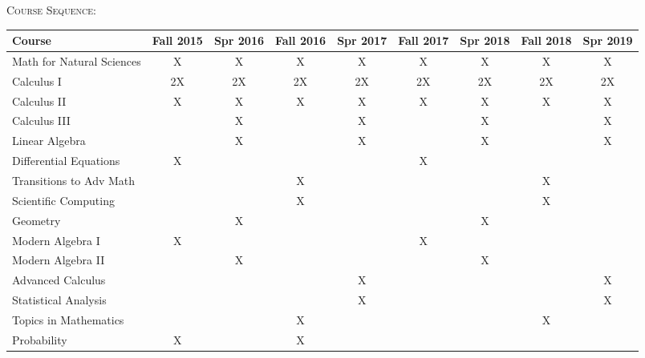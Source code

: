 \documentclass[letterpaper,10pt]{article}
\begin{document}
\begin{center}
\begin{minipage}[t]{.85\textwidth}
{\scshape  \Large Course Sequence:}\\[5pt]
\setlength{\extrarowheight}{2pt}
\begin{tabular}{ l | c | c | c |c |c |c |c |c |}
Course & Fall 2015 & Spr 2016 & Fall 2016 & Spr 2017 & Fall 2017 & Spr 2018 & Fall 2018 & Spr 2019\\
\hline
\hline
Math for Natural Sciences & X & X & X & X & X & X & X & X\\[2pt]
Calculus I                & 2X & 2X & 2X & 2X & 2X & 2X & 2X & 2X\\[2pt]
Calculus II               & X & X & X & X & X & X & X & X\\[2pt]
Calculus III              &  & X &  & X & & X & & X \\[2pt]
Linear Algebra            &  & X &  & X & & X & & X  \\[2pt]
Differential Equations    & X & & & & X &  &  &  \\[2pt]
Transitions to Adv Math   & & & X & & & & X &  \\[2pt]
Scientific Computing      & & & X & & & & X &  \\[2pt]
Geometry                  & & X & & & & X & &   \\[2pt]
Modern Algebra I          & X & & & & X & & & \\[2pt]
Modern Algebra II         & & X & & & & X & &  \\[2pt]
Advanced Calculus         & & & & X & & & & X \\[2pt]
Statistical Analysis      & & & & X & & & & X \\[2pt]
Topics in Mathematics     & & & X & & & & X &  \\[2pt]
{\color{gray} Probability} &X & & X & & & & &  \\
\hline
\end{tabular}
\end{minipage}
\end{center}
\end{document}
